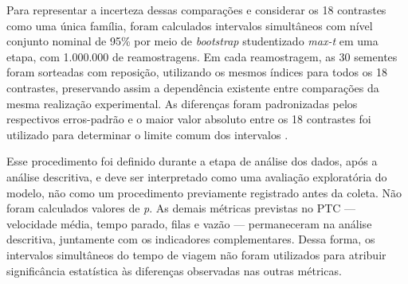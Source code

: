 Para representar a incerteza dessas comparações e considerar os 18 contrastes como uma única família, foram calculados intervalos simultâneos com nível conjunto nominal de 95\% por meio de \textit{bootstrap} studentizado \textit{max-t} em uma etapa, com 1.000.000 de reamostragens. Em cada reamostragem, as 30 sementes foram sorteadas com reposição, utilizando os mesmos índices para todos os 18 contrastes, preservando assim a dependência existente entre comparações da mesma realização experimental. As diferenças foram padronizadas pelos respectivos erros-padrão e o maior valor absoluto entre os 18 contrastes foi utilizado para determinar o limite comum dos intervalos \cite{romano_wolf_2005_stepwise,diciccio_efron_1996_bootstrap}.

Esse procedimento foi definido durante a etapa de análise dos dados, após a análise descritiva, e deve ser interpretado como uma avaliação exploratória do modelo, não como um procedimento previamente registrado antes da coleta. Não foram calculados valores de \textit{p}. As demais métricas previstas no PTC --- velocidade média, tempo parado, filas e vazão --- permaneceram na análise descritiva, juntamente com os indicadores complementares. Dessa forma, os intervalos simultâneos do tempo de viagem não foram utilizados para atribuir significância estatística às diferenças observadas nas outras métricas.

